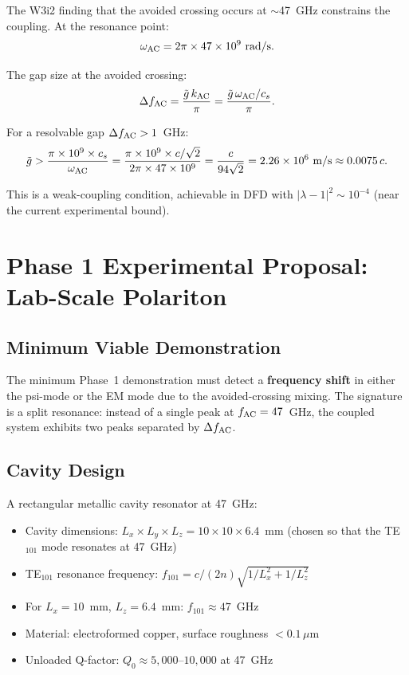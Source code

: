 \documentclass[aps,prd,twocolumn,superscriptaddress]{revtex4-2}
\begin{document}
The W3i2 finding that the avoided crossing occurs at $\sim$47~GHz
constrains the coupling.  At the resonance point:
\begin{equation}
\omega_{\rm AC} = 2\pi \times 47\times10^9~\text{rad/s}.
\end{equation}

The gap size at the avoided crossing:
\begin{equation}
\Delta f_{\rm AC} = \frac{\tilde{g}\,k_{\rm AC}}{\pi}
= \frac{\tilde{g}\,\omega_{\rm AC}/c_s}{\pi}.
\end{equation}

For a resolvable gap $\Delta f_{\rm AC} > 1$~GHz:
\begin{equation}
\tilde{g} > \frac{\pi \times 10^9 \times c_s}{\omega_{\rm AC}}
= \frac{\pi \times 10^9 \times c/\sqrt{2}}{2\pi\times47\times10^9}
= \frac{c}{94\sqrt{2}}
= 2.26\times10^6~\text{m/s} \approx 0.0075\,c.
\end{equation}

This is a weak-coupling condition, achievable in DFD with
$|\lambda-1|^2 \sim 10^{-4}$ (near the current experimental bound).

\section{Phase 1 Experimental Proposal: Lab-Scale Polariton}
\label{sec:phase1}

\subsection{Minimum Viable Demonstration}

The minimum Phase~1 demonstration must detect a \textbf{frequency shift}
in either the psi-mode or the EM mode due to the avoided-crossing mixing.
The signature is a split resonance: instead of a single peak at
$f_{\rm AC} = 47$~GHz, the coupled system exhibits two peaks separated
by $\Delta f_{\rm AC}$.

\subsection{Cavity Design}

A rectangular metallic cavity resonator at 47~GHz:
\begin{itemize}
  \item Cavity dimensions: $L_x \times L_y \times L_z = 10 \times 10 \times 6.4$~mm
    (chosen so that the TE$_{101}$ mode resonates at 47~GHz)
  \item TE$_{101}$ resonance frequency: $f_{101} = c/(2n)\sqrt{1/L_x^2 + 1/L_z^2}$
  \item For $L_x = 10$~mm, $L_z = 6.4$~mm: $f_{101} \approx 47$~GHz
  \item Material: electroformed copper, surface roughness $< 0.1\,\mu$m
  \item Unloaded Q-factor: $Q_0 \approx 5{,}000$--$10{,}000$ at 47~GHz
\end{itemize}
\end{document}
